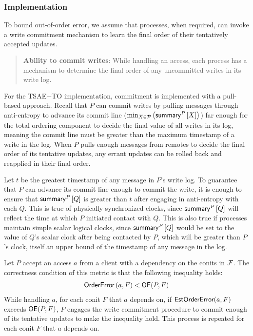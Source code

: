 \documentclass[]             %
{NASA}                       %
\theoremstyle{definition}
\begin{document}
\subsubsection{Implementation}
To bound out-of-order error, we assume that processes, when required,
can invoke a write commitment mechanism to learn the final order of
their tentatively accepted updates.
\begin{quote}
  \textbf{Ability to commit writes}: While handling an access, each
  process has a mechanism to determine the final order of any
  uncommitted writes in its write log.
\end{quote}

For the TSAE+TO implementation, commitment is implemented with a
pull-based approach. Recall that $P$ can commit writes by pulling
messages through anti-entropy to advance its commit line
($\min_{X \in \mathcal{P}} \left(\mathsf{summary}^{P}\left[X\right]\right)$) far enough for
the total ordering component to decide the final value of all writes
in its log, meaning the commit line must be greater than the maximum
timestamp of a write in the log. When $P$ pulls enough messages from
remotes to decide the final order of its tentative updates, any errant
updates can be rolled back and reapplied in their final order.

Let $t$ be the greatest timestamp of any message in $P$'s write
log. To guarantee that $P$ can advance its commit line enough to
commit the write, it is enough to ensure that $\mathsf{summary}^{P}\left[Q\right]$ is
greater than $t$ after engaging in anti-entropy with each $Q$. This is
true of physically synchronized clocks, since $\mathsf{summary}^{P}\left[Q\right]$ will
reflect the time at which $P$ initiated contact with $Q$. This is also
true if processes maintain simple scalar logical clocks, since
$\mathsf{summary}^{P}\left[Q\right]$ would be set to the value of $Q$'s scalar clock after
being contacted by $P$, which will be greater than $P$'s clock, itself
an upper bound of the timestamp of any message in the log.

Let $P$ accept an access $a$ from a client with a dependency on the
conits in $\mathcal{F}$. The correctness condition of this metric is that
the following inequality holds:
\begin{equation}
  \mathsf{OrderError}\left(a,F\right) < \mathsf{OE}(P, F)
\end{equation}
While handling $a$, for each conit $F$ that $a$ depends on, if
$\mathsf{EstOrderError}(a, F)$ exceeds $\mathsf{OE}(P, F)$, $P$ engages the write
commitment procedure to commit enough of its tentative updates to make
the inequality hold. This process is repeated for each conit $F$ that
$a$ depends on.
\end{document}
